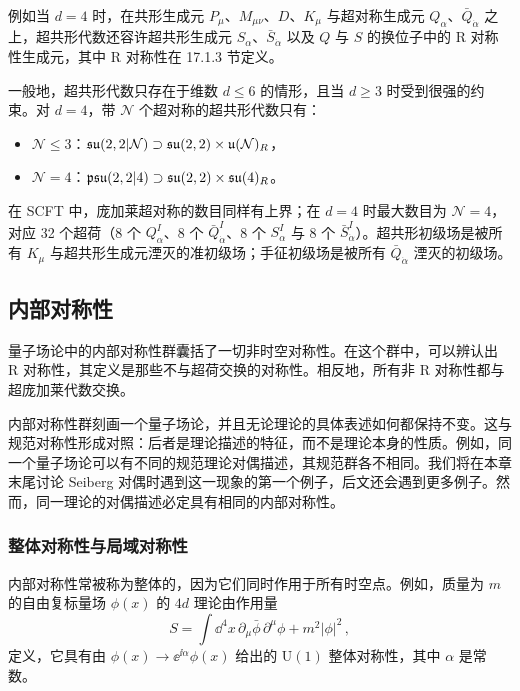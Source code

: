 例如当 $d=4$ 时，在共形生成元 $P_\mu$、$M_{\mu\nu}$、$D$、$K_\mu$ 与超对称生成元 $Q_\alpha$、$\bar Q_{\dot\alpha}$ 之上，超共形代数还容许超共形生成元 $S_\alpha$、$\bar S_{\dot\alpha}$ 以及 $Q$ 与 $S$ 的换位子中的 R 对称性生成元，其中 R 对称性在 17.1.3 节定义。

一般地，超共形代数只存在于维数 $d\le 6$ 的情形，且当 $d\ge 3$ 时受到很强的约束。对 $d=4$，带 $\mathcal{N}$ 个超对称的超共形代数只有：

\begin{itemize}[leftmargin=2em]
\item $\mathcal{N}\le 3$：$\mathfrak{su}(2,2|\mathcal{N})\supset\mathfrak{su}(2,2)\times\mathfrak{u}(\mathcal{N})_R$，
\item $\mathcal{N}=4$：$\mathfrak{psu}(2,2|4)\supset\mathfrak{su}(2,2)\times\mathfrak{su}(4)_R$。
\end{itemize}

在 SCFT 中，庞加莱超对称的数目同样有上界；在 $d=4$ 时最大数目为 $\mathcal{N}=4$，对应 32 个超荷（8 个 $Q^I_\alpha$、8 个 $\bar Q^I_{\dot\alpha}$、8 个 $S^I_\alpha$ 与 8 个 $\bar S^I_{\dot\alpha}$）。超共形初级场是被所有 $K_\mu$ 与超共形生成元湮灭的准初级场；手征初级场是被所有 $\bar Q_{\dot\alpha}$ 湮灭的初级场。

\subsection{内部对称性}

量子场论中的内部对称性群囊括了一切非时空对称性。在这个群中，可以辨认出 R 对称性，其定义是那些不与超荷交换的对称性。相反地，所有非 R 对称性都与超庞加莱代数交换。

内部对称性群刻画一个量子场论，并且无论理论的具体表述如何都保持不变。这与规范对称性形成对照：后者是理论描述的特征，而不是理论本身的性质。例如，同一个量子场论可以有不同的规范理论对偶描述，其规范群各不相同。我们将在本章末尾讨论 Seiberg 对偶时遇到这一现象的第一个例子，后文还会遇到更多例子。然而，同一理论的对偶描述必定具有相同的内部对称性。

\subsubsection*{整体对称性与局域对称性}

内部对称性常被称为整体的，因为它们同时作用于所有时空点。例如，质量为 $m$ 的自由复标量场 $\phi(x)$ 的 $4d$ 理论由作用量
\begin{equation}
S=\int \dd^4x\,\partial_\mu\bar\phi\,\partial^\mu\phi+m^2|\phi|^2\,,
\tag{17.4}
\end{equation}
定义，它具有由 $\phi(x)\to\ee^{\ii\alpha}\phi(x)$ 给出的 $\mathrm{U}(1)$ 整体对称性，其中 $\alpha$ 是常数。

